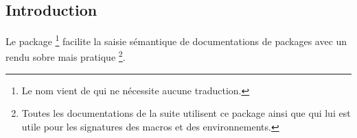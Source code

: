 \documentclass[12pt,a4paper]{article}
\begin{document}
\subsection{Introduction}

Le package 
\footnote{
    Le nom vient de  qui ne nécessite aucune traduction.
}
facilite la saisie sémantique de documentations de packages avec un rendu sobre mais pratique
\footnote{
    Toutes les documentations de la suite  utilisent ce package ainsi que  qui lui est utile pour les signatures des macros et des environnements.
}.
\end{document}
